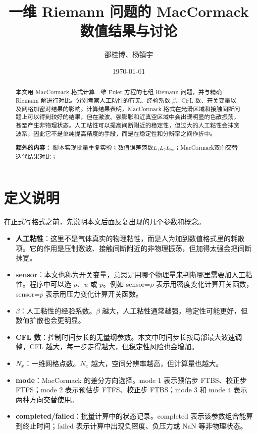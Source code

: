 \documentclass[UTF8,12pt,a4paper]{ctexart}
\title{一维 Riemann 问题的 MacCormack 数值结果与讨论}
\author{邵桂博、杨镇宇}
\date{\today}
\begin{document}
\maketitle

\begin{abstract}
本文用 MacCormack 格式计算一维 Euler 方程的七组 Riemann 问题，并与精确 Riemann 解进行对比。分别考察人工粘性的有无、经验系数 $\beta$、CFL 数、开关变量以及网格加密对结果的影响。计算结果表明，MacCormack 格式在光滑区域和接触间断问题上可以得到较好的结果，但在激波、强膨胀和近真空区域中会出现明显的色散振荡，甚至产生非物理状态。人工粘性可以提高间断附近的稳定性，但过大的人工粘性会抹宽波系，因此它不是单纯提高精度的手段，而是在稳定性和分辨率之间作折中。

\textbf{额外的内容：} 脚本实现批量重复实验；数值误差范数$L_1$$L_2$$L_\infty$；MacCormack双向交替迭代结果对比；
\end{abstract}

\tableofcontents
\newpage

\section{定义说明}

在正式写格式之前，先说明本文后面反复出现的几个参数和概念。
\begin{itemize}
    \item \textbf{人工粘性}：这里不是气体真实的物理粘性，而是人为加到数值格式里的耗散项。它的作用是压制激波、接触间断附近的非物理振荡，但加得太强会把间断抹宽。
    \item \textbf{sensor}：本文也称为开关变量，意思是用哪个物理量来判断哪里需要加人工粘性。程序中可以选 $\rho$、$u$ 或 $p$。例如 sensor=$\rho$ 表示用密度变化计算开关函数，sensor=$p$ 表示用压力变化计算开关函数。
    \item \textbf{$\beta$}：人工粘性的经验系数。$\beta$ 越大，人工粘性通常越强，稳定性可能更好，但数值扩散也会更明显。
    \item \textbf{CFL 数}：控制时间步长的无量纲参数。本文中时间步长按局部最大波速调整，CFL 越大，每一步走得越大，但稳定性风险也会增加。
    \item \textbf{$N_x$}：一维网格点数。$N_x$ 越大，空间分辨率越高，但计算量也越大。
    \item \textbf{mode}：MacCormack 的差分方向选择。mode 1 表示预估步 FTBS、校正步 FTFS；mode 2 表示预估步 FTFS、校正步 FTBS；mode 3 和 mode 4 表示两种方向交替使用。
    \item \textbf{completed/failed}：批量计算中的状态记录。completed 表示该参数组合能算到终止时间；failed 表示计算中出现负密度、负压力或 NaN 等非物理状态。
\end{itemize}
\end{document}
